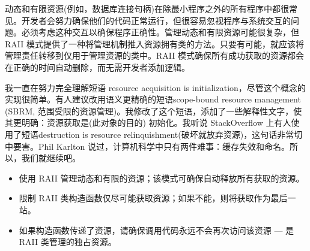 动态和有限资源(例如，数据库连接句柄)在除最小程序之外的所有程序中都很常见。开发者会努力确保他们的代码正常运行，但很容易忽视程序与系统交互的问题。必须考虑这种交互以确保程序正确性。管理动态和有限资源可能很复杂，但 RAII 模式提供了一种将管理机制推入资源拥有类的方法。只要有可能，就应该将管理责任转移到仅用于管理资源的类中。RAII 模式确保所有成功获取的资源都会在正确的时间自动删除，而无需开发者添加逻辑。

我一直在努力完全理解短语 resource acquisition is initialization，尽管这个概念的实现很简单。有人建议改用语义更精确的短语scope-bound resource management (SBRM, 范围受限的资源管理)。我修改了这个短语，添加了一些解释性文字，使其更明确：资源获取是(此对象的目的) 初始化。我听说 StackOverflow 上有人使用了短语destruction is resource relinquishment(破坏就放弃资源)，这句话非常切中要害。Phil Karlton 说过，计算机科学中只有两件难事：缓存失效和命名。所以，我们就继续吧。


\begin{itemize}
\item
使用 RAII 管理动态和有限的资源；该模式可确保自动释放所有获取的资源。

\item
限制 RAII 类构造函数仅尽可能获取资源；如果不能，则将获取作为最后一站。

\item
如果构造函数传递了资源，请确保调用代码永远不会再次访问该资源 — 是 RAII 类管理的独占资源。
\end{itemize}





